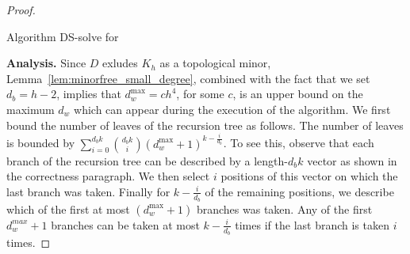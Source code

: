 \begin{proof}
\begin{algorithm}[t]



 \BlankLine
  \caption{Algorithm {\sc DS-solve} for {\ds}}\label{algo:minor_algo_domset}
\end{algorithm}\noindent
{\bf Analysis.} 
Since $D$ exludes $K_h$ as a topological minor, Lemma~\ref{lem:minorfree_small_degree}, combined with the fact that we set $d_b = h-2$, implies that $d_w^{\max}=ch^4$, for some $c$, is an upper bound on the maximum $d_w$ which can appear during the execution of the algorithm. 
We first bound the number of leaves of the recursion tree as follows. The number of leaves is bounded by 
$\sum_{i=0}^{d_b k} \binom{d_b k}{i} (d_w^{\max}+1)^{k-{\frac i {d_b}}}$. To see this, observe that each branch of the recursion tree can be described by a length-$d_b k$ vector as shown in the correctness paragraph. We then select $i$ positions of this vector on which the last branch was taken. Finally for  $k-{\frac i {d_b}}$ of the remaining positions, we describe which of the first at most $(d_w^{\max}+1)$ branches was taken. Any of the first $d_w^{max}+1$ branches can be taken at most $k-{\frac i {d_b}}$ times if the last branch is taken $i$ times.


\end{proof}
